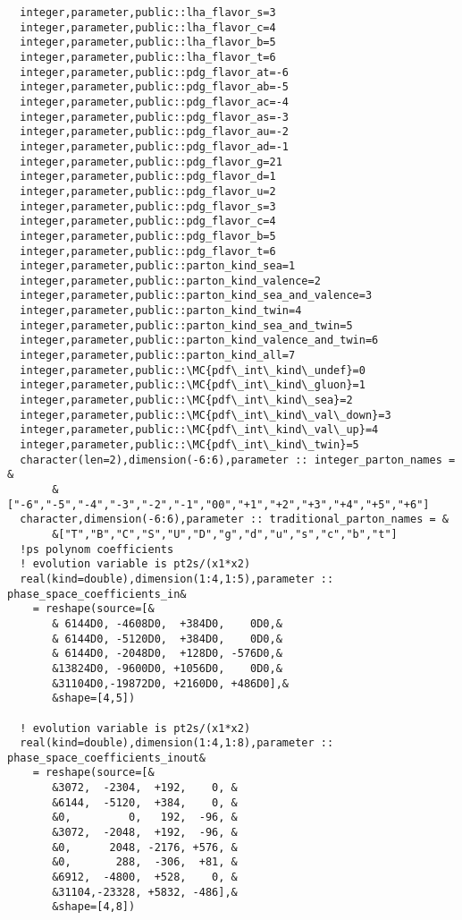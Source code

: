 \begin{Verbatim}
  integer,parameter,public::lha_flavor_s=3
  integer,parameter,public::lha_flavor_c=4
  integer,parameter,public::lha_flavor_b=5
  integer,parameter,public::lha_flavor_t=6
  integer,parameter,public::pdg_flavor_at=-6
  integer,parameter,public::pdg_flavor_ab=-5
  integer,parameter,public::pdg_flavor_ac=-4
  integer,parameter,public::pdg_flavor_as=-3
  integer,parameter,public::pdg_flavor_au=-2
  integer,parameter,public::pdg_flavor_ad=-1
  integer,parameter,public::pdg_flavor_g=21
  integer,parameter,public::pdg_flavor_d=1
  integer,parameter,public::pdg_flavor_u=2
  integer,parameter,public::pdg_flavor_s=3
  integer,parameter,public::pdg_flavor_c=4
  integer,parameter,public::pdg_flavor_b=5
  integer,parameter,public::pdg_flavor_t=6
  integer,parameter,public::parton_kind_sea=1
  integer,parameter,public::parton_kind_valence=2
  integer,parameter,public::parton_kind_sea_and_valence=3
  integer,parameter,public::parton_kind_twin=4
  integer,parameter,public::parton_kind_sea_and_twin=5
  integer,parameter,public::parton_kind_valence_and_twin=6
  integer,parameter,public::parton_kind_all=7
  integer,parameter,public::\MC{pdf\_int\_kind\_undef}=0
  integer,parameter,public::\MC{pdf\_int\_kind\_gluon}=1
  integer,parameter,public::\MC{pdf\_int\_kind\_sea}=2
  integer,parameter,public::\MC{pdf\_int\_kind\_val\_down}=3
  integer,parameter,public::\MC{pdf\_int\_kind\_val\_up}=4
  integer,parameter,public::\MC{pdf\_int\_kind\_twin}=5
  character(len=2),dimension(-6:6),parameter :: integer_parton_names = &
       &["-6","-5","-4","-3","-2","-1","00","+1","+2","+3","+4","+5","+6"]
  character,dimension(-6:6),parameter :: traditional_parton_names = &
       &["T","B","C","S","U","D","g","d","u","s","c","b","t"]
  !ps polynom coefficients
  ! evolution variable is pt2s/(x1*x2)
  real(kind=double),dimension(1:4,1:5),parameter :: phase_space_coefficients_in&
    = reshape(source=[&
       & 6144D0, -4608D0,  +384D0,    0D0,&
       & 6144D0, -5120D0,  +384D0,    0D0,&
       & 6144D0, -2048D0,  +128D0, -576D0,&
       &13824D0, -9600D0, +1056D0,    0D0,&
       &31104D0,-19872D0, +2160D0, +486D0],&
       &shape=[4,5])

  ! evolution variable is pt2s/(x1*x2)
  real(kind=double),dimension(1:4,1:8),parameter :: phase_space_coefficients_inout&
    = reshape(source=[&
       &3072,  -2304,  +192,    0, &
       &6144,  -5120,  +384,    0, &
       &0,         0,   192,  -96, &
       &3072,  -2048,  +192,  -96, & 
       &0,      2048, -2176, +576, & 
       &0,       288,  -306,  +81, &
       &6912,  -4800,  +528,    0, &
       &31104,-23328, +5832, -486],&
       &shape=[4,8])


\end{Verbatim}
